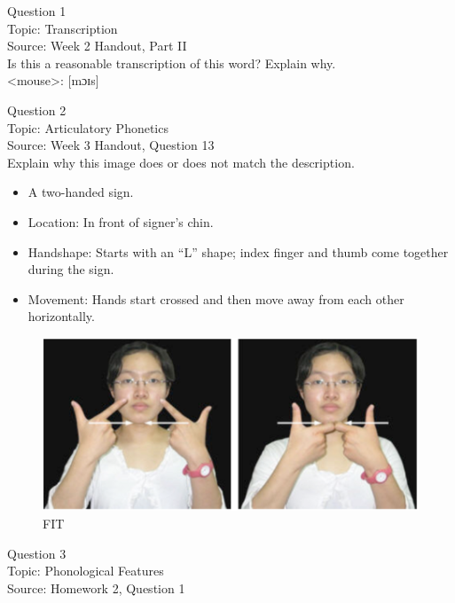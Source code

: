 \documentclass[12pt]{article}
\begin{document}
{\large Question 1}\\

Topic: Transcription\\
Source: Week 2 Handout, Part II\\

Is this a reasonable transcription of this word? Explain why.\\

<mouse>: {[mɔɪs]}


\newpage

{\large Question 2}\\

Topic: Articulatory Phonetics\\
Source: Week 3 Handout, Question 13\\

Explain why this image does or does not match the description.\\

\begin{itemize} \item A two-handed sign. \item Location: In front of signer’s chin. \item Handshape: Starts with an “L” shape; index finger and thumb come together during the sign. \item Movement: Hands start crossed and then move away from each other horizontally. \end{itemize}

\begin{figure}[H]
\includegraphics{../images/taiwansign_fit.png}
\caption{FIT}
\end{figure}

\newpage

{\large Question 3}\\

Topic: Phonological Features\\
Source: Homework 2, Question 1\\
\end{document}
